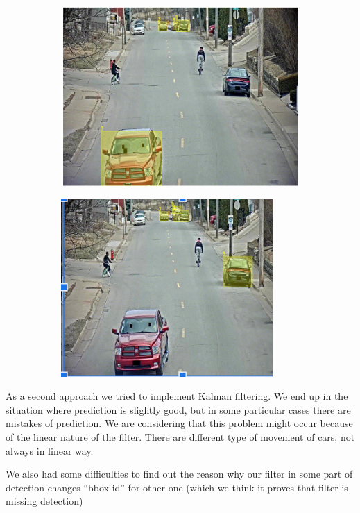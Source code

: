 \documentclass[journal, a4paper]{IEEEtran}
\begin{document}
\begin{figure}[ht] \centering
\begin{subfigure}[b]{0.22\textwidth}
\includegraphics[scale=.7]{images/img1.PNG}   
\end{subfigure}
\hspace{0.2cm}
\begin{subfigure}[b]{0.22\textwidth}
\includegraphics[scale=.7]{images/img2.PNG}   
\end{subfigure}
\end{figure}


As a second approach we tried to implement Kalman filtering. We end up in the situation where prediction is slightly good, but in some particular cases there are mistakes of prediction. 
We are considering that this problem might occur because of the linear nature of the filter. There are different type of movement of cars, not always in linear way. 

We also had some difficulties to find out the reason why our filter in some part of detection changes “bbox id” for other one (which we think it proves that filter is missing detection)
\end{document}
